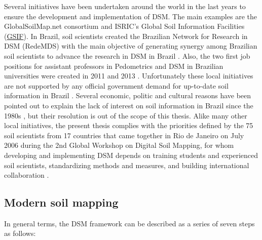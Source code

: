 Several initiatives have been undertaken around the world in the last years to 
ensure the development and implementation of DSM. The main examples are the 
GlobalSoilMap.net consortium and ISRIC's Global Soil Information Facilities
(\href{http://www.isric.org/projects/global-soil-information-facilities-gsif}{GSIF}).
In Brazil, soil scientists created the Brazilian Network for Research in DSM 
(RedeMDS) with the main objective of generating synergy among Brazilian soil 
scientists to advance the research in DSM in Brazil \cite{RedeMDS2013}. Also, 
the two first job positions for assistant professors in Pedometrics and DSM in 
Brazilian universities were created in 2011 and 2013 \cite{UFRRJ2011,UFSM2012}. 
Unfortunately these local initiatives are not supported by any official 
government demand for up-to-date soil information in Brazil 
\cite{SamuelRosa2012}. Several economic, politic and cultural reasons have been 
pointed out to explain the lack of interest on soil information in Brazil since 
the 1980s \cite{Dalmolin1999, Ker1999, KerEtAl2003, Ramos2003, Espindola2008}, 
but their resolution is out of the scope of this thesis. Alike many other local
initiatives, the present thesis complies with the priorities defined by the 75 
soil scientists from 17 countries that came together in Rio de Janeiro on July 
2006 during the 2nd Global Workshop on Digital Soil Mapping, for whom developing
and implementing DSM depends on training students and experienced soil 
scientists, standardizing methods and measures, and building international 
collaboration \cite{Boettinger2004}.

\subsection{Modern soil mapping} %

In general terms, the DSM framework can be described as a series of seven steps 
as follows:

